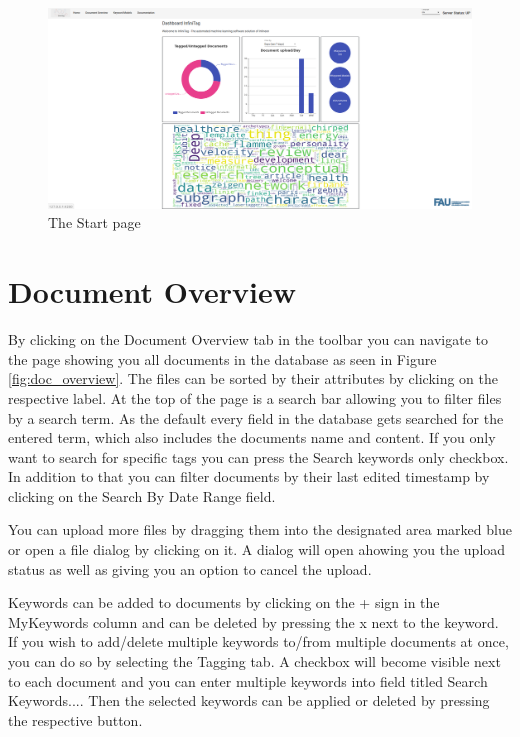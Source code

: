 \documentclass{article}
\begin{document}
\begin{figure}
    \centering
    \includegraphics[scale=0.25]{img/dashboard.png}
    \caption{The Start page}
    \label{fig:start_page}
\end{figure}


\section{Document Overview}

By clicking on the Document Overview tab in the toolbar you can navigate to the page showing you all documents in the database as seen in Figure \ref{fig:doc_overview}.
The files can be sorted by their attributes by clicking on the respective label. At the top of the page is a search bar allowing you to filter files by a search term.
As the default every field in the database gets searched for the entered term, which also includes the documents name and content.
If you only want to search for specific tags you can press the Search keywords only checkbox.
In addition to that you can filter documents by their last edited timestamp by clicking on the Search By Date Range field.

You can upload more files by dragging them into the designated area marked blue or open a file dialog by clicking on it.
A dialog will open ahowing you the upload status as well as giving you an option to cancel the upload.

Keywords can be added to documents by clicking on the + sign in the MyKeywords column and can be deleted by pressing the x next to the keyword.
If you wish to add/delete multiple keywords to/from multiple documents at once, you can do so by selecting the Tagging tab.
A checkbox will become visible next to each document and you can enter multiple keywords into field titled Search Keywords....
Then the selected keywords can be applied or deleted by pressing the respective button.
\end{document}
